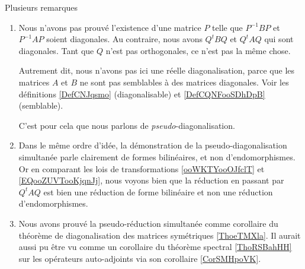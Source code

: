 \begin{remark}
    Plusieurs remarques
    \begin{enumerate}
        \item

            Nous n'avons pas prouvé l'existence d'une matrice \( P\) telle que \( P^{-1}BP\) et \( P^{-1}AP\) soient diagonales. Au contraire, nous avons \( Q^tBQ\) et \( Q^tAQ\) qui sont diagonales. Tant que \( Q\) n'est pas orthogonales, ce n'est pas la même chose.

            Autrement dit, nous n'avons pas ici une réelle diagonalisation, parce que les matrices \( A\) et \( B\) ne sont pas semblables à des matrices diagonales. Voir les définitions \ref{DefCNJqsmo} (diagonalisable) et \ref{DefCQNFooSDhDpB} (semblable).

            C'est pour cela que nous parlons de \emph{pseudo}-diagonalisation.

        \item

            Dans le même ordre d'idée, la démonstration de la pseudo-diagonalisation simultanée parle clairement de formes bilinéaires, et non d'endomorphismes. Or en comparant les lois de transformations \eqref{ooWKTYooOJfclT} et \eqref{EQooZUVTooKjqnJj}, nous voyons bien que la réduction en passant par \( Q^tAQ\) est bien une réduction de forme bilinéaire et non une réduction d'endomorphismes.
    
        \item

            Nous avons prouvé la pseudo-réduction simultanée comme corollaire du théorème de diagonalisation des matrices symétriques \ref{ThoeTMXla}. Il aurait aussi pu être vu comme un corollaire du théorème spectral \ref{ThoRSBahHH} sur les opérateurs auto-adjoints via son corollaire \ref{CorSMHpoVK}.
    \end{enumerate}
\end{remark}
